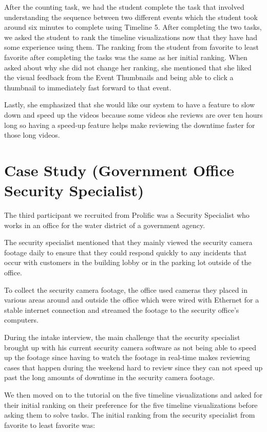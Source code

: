 \documentclass[doublespace,draft,nopageskip]{VTthesis} %
\begin{document}
After the counting task, we had the student complete the task that involved understanding the sequence between two different events which the student took around six minutes to complete using Timeline 5. After completing the two tasks, we asked the student to rank the timeline visualizations now that they have had some experience using them. The ranking from the student from favorite to least favorite after completing the tasks was the same as her initial ranking. When asked about why she did not change her ranking, she mentioned that she liked the visual feedback from the Event Thumbnails and being able to click a thumbnail to immediately fast forward to that event.

Lastly, she emphasized that she would like our system to have a feature to slow down and speed up the videos because some videos she reviews are over ten hours long so having a speed-up feature helps make reviewing the downtime faster for those long videos.

\section{Case Study (Government Office Security Specialist)} \label{se:one_section}
The third participant we recruited from Prolific was a Security Specialist who works in an office for the water district of a government agency. 

The security specialist mentioned that they mainly viewed the security camera footage daily to ensure that they could respond quickly to any incidents that occur with customers in the building lobby or in the parking lot outside of the office. 

To collect the security camera footage, the office used cameras they placed in various areas around and outside the office which were wired with Ethernet for a stable internet connection and streamed the footage to the security office's computers. 

During the intake interview, the main challenge that the security specialist brought up with his current security camera software as not being able to speed up the footage since having to watch the footage in real-time makes reviewing cases that happen during the weekend hard to review since they can not speed up past the long amounts of downtime in the security camera footage.

We then moved on to the tutorial on the five timeline visualizations and asked for their initial ranking on their preference for the five timeline visualizations before asking them to solve tasks. The initial ranking from the security specialist from favorite to least favorite was: 
\end{document}
